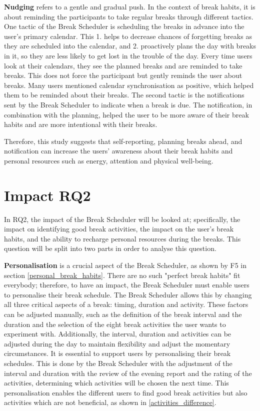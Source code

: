 \documentclass{hasel_thesis}
\begin{document}
\textbf{Nudging} refers to a gentle and gradual push. In the context of break habits, it is about reminding the participants to take regular breaks through different tactics. One tactic of the Break Scheduler is scheduling the breaks in advance into the user's primary calendar. This 1. helps to decrease chances of forgetting breaks as they are scheduled into the calendar, and 2. proactively plans the day with breaks in it, so they are less likely to get lost in the trouble of the day. Every time users look at their calendars, they see the planned breaks and are reminded to take breaks. This does not force the participant but gently reminds the user about breaks. Many users mentioned calendar synchronisation as positive, which helped them to be reminded about their breaks. The second tactic is the notifications sent by the Break Scheduler to indicate when a break is due. The notification, in combination with the planning, helped the user to be more aware of their break habits and are more intentional with their breaks. 

Therefore, this study suggests that self-reporting, planning breaks ahead, and notification can increase the users' awareness about their break habits and personal resources such as energy, attention and physical well-being.

\section{Impact RQ2} %
In RQ2, the impact of the Break Scheduler will be looked at; specifically, the impact on identifying good break activities, the impact on the user's break habits, and the ability to recharge personal resources during the breaks. This question will be split into two parts in order to analyse this question.

\textbf{Personalisation} is a crucial aspect of the Break Scheduler, as shown by F5 in section \ref{personal_break_habits}. There are no such "perfect break habits" fit everybody; therefore, to have an impact, the Break Scheduler must enable users to personalise their break schedule. The Break Scheduler allows this by changing all three critical aspects of a break: timing, duration and activity. These factors can be adjusted manually, such as the definition of the break interval and the duration and the selection of the eight break activities the user wants to experiment with. Additionally, the interval, duration and activities can be adjusted during the day to maintain flexibility and adjust the momentary circumstances. It is essential to support users by personalising their break schedules. This is done by the Break Scheduler with the adjustment of the interval and duration with the review of the evening report and the rating of the activities, determining which activities will be chosen the next time. This personalisation enables the different users to find good break activities but also activities which are not beneficial, as shown in \ref{activities_difference}.
\end{document}
